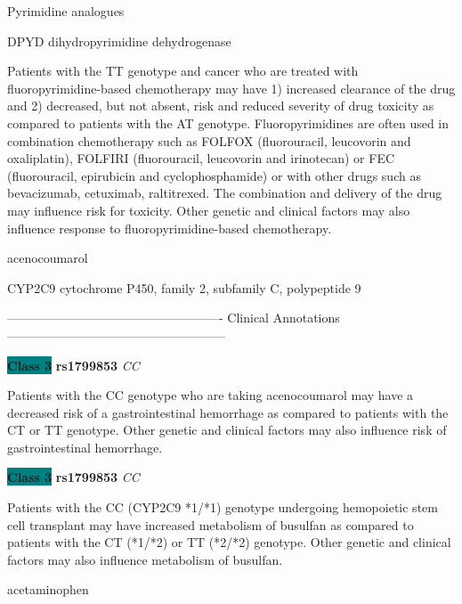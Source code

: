 \documentclass{resume} %
\begin{document}
\begin{rSection}{ Pyrimidine analogues }
\begin{rSubsection}{ DPYD }{ dihydropyrimidine dehydrogenase }{}{}
\item[] Patients with the TT genotype and cancer who are treated with fluoropyrimidine-based chemotherapy may have 1) increased clearance of the drug and 2) decreased, but not absent, risk and reduced severity of drug toxicity as compared to patients with the AT genotype. Fluoropyrimidines are often used in combination chemotherapy such as FOLFOX (fluorouracil, leucovorin and oxaliplatin), FOLFIRI (fluorouracil, leucovorin and irinotecan) or FEC (fluorouracil, epirubicin and cyclophosphamide) or with other drugs such as bevacizumab, cetuximab, raltitrexed. The combination and delivery of the drug may influence risk for toxicity. Other genetic and clinical factors may also influence response to fluoropyrimidine-based chemotherapy.
\end{rSubsection}

\end{rSection}\begin{rSection}{ acenocoumarol }
\item[]

\begin{rSubsection}{ CYP2C9 }{ cytochrome P450, family 2, subfamily C, polypeptide 9 }{}{}
\item[]

\item[] ---------------------------------------------------- Clinical Annotations -----------------------------------------------------\newline
\item \textbf{\colorbox{teal} {Class 3}} \textbf{ rs1799853 } \textit{ CC }
\item[] Patients with the CC genotype who are taking acenocoumarol may have a decreased risk of a gastrointestinal hemorrhage as compared to patients with the CT or TT genotype. Other genetic and clinical factors may also influence risk of gastrointestinal hemorrhage.\item \textbf{\colorbox{teal} {Class 3}} \textbf{ rs1799853 } \textit{ CC }
\item[] Patients with the CC (CYP2C9 *1/*1) genotype undergoing hemopoietic stem cell transplant may have increased metabolism of busulfan as compared to patients with the CT (*1/*2) or TT (*2/*2) genotype. Other genetic and clinical factors may also influence metabolism of busulfan.
\end{rSubsection}

\end{rSection}\begin{rSection}{ acetaminophen }
\item[]


\end{rSection}
\end{document}
